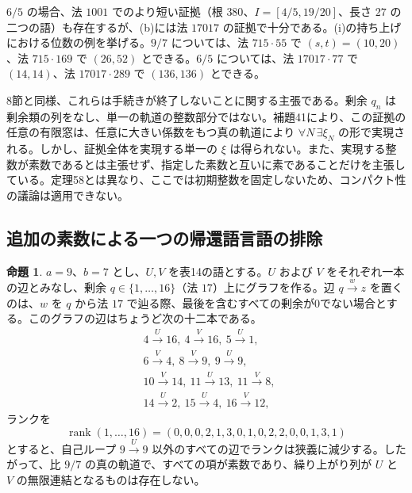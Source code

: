 \documentclass[11pt,reqno]{amsart}
\theoremstyle{definition}
\newtheorem{proposition}[theorem]{命題}
\theoremstyle{definition}
\theoremstyle{remark}
\begin{document}
\(6/5\) の場合、法 \(1001\) でのより短い証拠（根 \(380\)、\(I=[4/5,19/20]\)、長さ \(27\) の二つの語）も存在するが、(b)には法 \(17017\) の証拠で十分である。(i)の持ち上げにおける位数の例を挙げる。\(9/7\) については、法 \(715\cdot55\) で \((s,t)=(10,20)\)、法 \(715\cdot169\) で \((26,52)\) とできる。\(6/5\) については、法 \(17017\cdot77\) で \((14,14)\)、法 \(17017\cdot289\) で \((136,136)\) とできる。

8節と同様、これらは手続きが終了しないことに関する主張である。剰余 \(q_n\) は剰余類の列をなし、単一の軌道の整数部分ではない。補題41により、この証拠の任意の有限窓は、任意に大きい係数をもつ真の軌道により \(\forall N\,\exists\xi_N\) の形で実現される。しかし、証拠全体を実現する単一の \(\xi\) は得られない。また、実現する整数が素数であるとは主張せず、指定した素数と互いに素であることだけを主張している。定理58とは異なり、ここでは初期整数を固定しないため、コンパクト性の議論は適用できない。

\subsection{追加の素数による一つの帰還語言語の排除}\label{sec:E.3}

\begin{samepage}
\begin{proposition}\leavevmode\label{thm:71}
\(a=9\)、\(b=7\) とし、\(U,V\) を表14の語とする。\(U\) および \(V\) をそれぞれ一本の辺とみなし、剰余 \(q\in\{1,\ldots,16\}\)（法 \(17\)）上にグラフを作る。辺 \(q\xrightarrow{w}z\) を置くのは、\(w\) を \(q\) から法 \(17\) で辿る際、最後を含むすべての剰余が0でない場合とする。このグラフの辺はちょうど次の十二本である。
\[
\begin{aligned}
&4\xrightarrow{U}16,\ 4\xrightarrow{V}16,\ 5\xrightarrow{U}1,\
\\
&6\xrightarrow{V}4,\ 8\xrightarrow{V}9,\ 9\xrightarrow{U}9,\
\\
&10\xrightarrow{V}14,\ 11\xrightarrow{U}13,\ 11\xrightarrow{V}8,\
\\
&14\xrightarrow{U}2,\ 15\xrightarrow{U}4,\ 16\xrightarrow{V}12,
\end{aligned}
\]
ランクを
\[
\operatorname{rank}(1,\ldots,16)=(0,0,0,2,1,3,0,1,0,2,2,0,0,1,3,1)
\]
とすると、自己ループ \(9\xrightarrow{U}9\) 以外のすべての辺でランクは狭義に減少する。したがって、比 \(9/7\) の真の軌道で、すべての項が素数であり、繰り上がり列が \(U\) と \(V\) の無限連結となるものは存在しない。
\label{thm-end:71}
\end{proposition}
\end{samepage}
\end{document}
